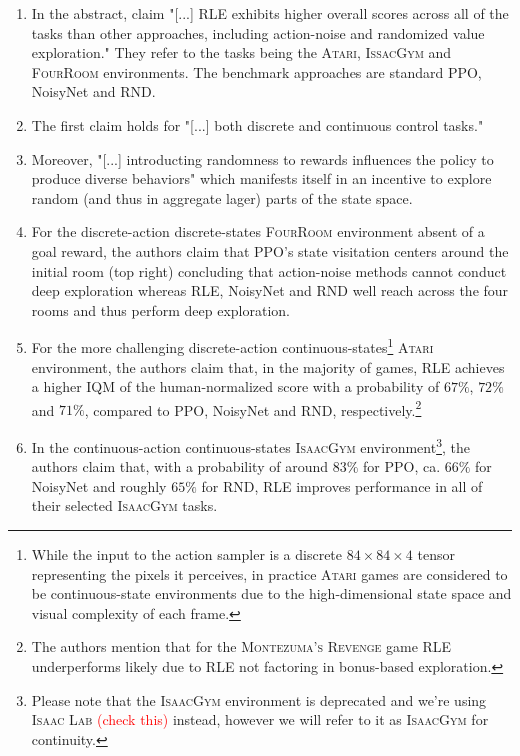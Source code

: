 \documentclass[10pt]{article} %
\begin{document}
\begin{enumerate}
    \item In the abstract, \cite{rle-paper} claim "[...] RLE exhibits higher overall scores across all of the tasks than other approaches, including action-noise and randomized value exploration." They refer to the tasks being the \textsc{Atari}, \textsc{IssacGym} and \textsc{FourRoom} environments. The benchmark approaches are standard PPO, NoisyNet and RND.
    \item The first claim holds for "[...] both discrete and continuous control tasks." \citep{rle-paper}
    \item Moreover, "[...] introducting randomness to rewards influences the policy to produce diverse behaviors" \citep{rle-paper} which manifests itself in an incentive to explore random (and thus in aggregate lager) parts of the state space.
    \item For the discrete-action discrete-states \textsc{FourRoom} environment absent of a goal reward, the authors claim that PPO's state visitation centers around the initial room (top right) concluding that action-noise methods cannot conduct deep exploration whereas RLE, NoisyNet and RND well reach across the four rooms and thus perform deep exploration.
    \item For the more challenging discrete-action continuous-states\footnote{While the input to the action sampler is a discrete $84\times84\times4$ tensor representing the pixels it perceives, in practice \textsc{Atari} games are considered to be continuous-state environments due to the high-dimensional state space and visual complexity of each frame.} \textsc{Atari} environment, the authors claim that, in the majority of games, RLE achieves a higher IQM of the human-normalized score with a probability of $67\%$, $72\%$ and $71\%$, compared to PPO, NoisyNet and RND, respectively.\footnote{The authors mention that for the \textsc{Montezuma's Revenge} game RLE underperforms likely due to RLE not factoring in bonus-based exploration.}
    \item In the continuous-action continuous-states \textsc{IsaacGym} environment\footnote{Please note that the \textsc{IsaacGym} environment is deprecated and we're using \textsc{Isaac Lab} \textcolor{red}{(check this)} instead, however we will refer to it as \textsc{IsaacGym} for continuity.}, the authors claim that, with a probability of around $83\%$ for PPO, ca. $66\%$ for NoisyNet and roughly $65\%$ for RND, RLE improves performance in all of their selected \textsc{IsaacGym} tasks.
\end{enumerate}
\end{document}
